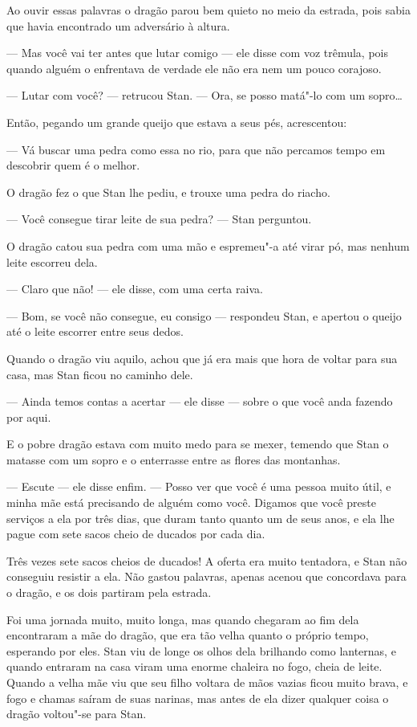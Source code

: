 Ao ouvir essas palavras o dragão parou bem quieto no meio da estrada,
pois sabia que havia encontrado um adversário à altura.

--- Mas você vai ter antes que lutar comigo --- ele disse com voz trêmula,
pois quando alguém o enfrentava de verdade ele não era nem um pouco
corajoso.

--- Lutar com você? --- retrucou Stan. --- Ora, se posso matá"-lo com um
sopro\ldots{}

Então, pegando um grande queijo que estava a seus pés, acrescentou:

--- Vá buscar uma pedra como essa no rio, para que não percamos tempo em
descobrir quem é o melhor.

O dragão fez o que Stan lhe pediu, e trouxe uma pedra do riacho.

--- Você consegue tirar leite de sua pedra? --- Stan perguntou.

O dragão catou sua pedra com uma mão e espremeu"-a até virar pó, mas
nenhum leite escorreu dela.

--- Claro que não! --- ele disse, com uma certa raiva.

--- Bom, se você não consegue, eu consigo --- respondeu Stan, e apertou o
queijo até o leite escorrer entre seus dedos.

Quando o dragão viu aquilo, achou que já era mais que hora de voltar
para sua casa, mas Stan ficou no caminho dele.

--- Ainda temos contas a acertar --- ele disse --- sobre o que você anda
fazendo por aqui.

E o pobre dragão estava com muito medo para se mexer, temendo que Stan
o matasse com um sopro e o enterrasse entre as flores
das montanhas.

--- Escute --- ele disse enfim. --- Posso ver que você é uma pessoa muito
útil, e minha mãe está precisando de alguém como você. Digamos que
você preste serviços a ela por três dias, que duram tanto quanto um
de seus anos, e ela lhe pague com sete sacos cheio de ducados por
cada dia.

Três vezes sete sacos cheios de ducados! A oferta era muito tentadora,
e Stan não conseguiu resistir a ela. Não gastou palavras, apenas
acenou que concordava para o dragão, e os dois partiram pela estrada.

Foi uma jornada muito, muito longa, mas quando chegaram ao fim dela
encontraram a mãe do dragão, que era tão velha quanto o próprio
tempo, esperando por eles. Stan viu de longe os olhos dela brilhando
como lanternas, e quando entraram na casa viram uma enorme chaleira
no fogo, cheia de leite. Quando a velha mãe viu que seu filho voltara
de mãos vazias ficou muito brava, e fogo e chamas saíram de suas
narinas, mas antes de ela dizer qualquer coisa o dragão voltou"-se
para Stan.

